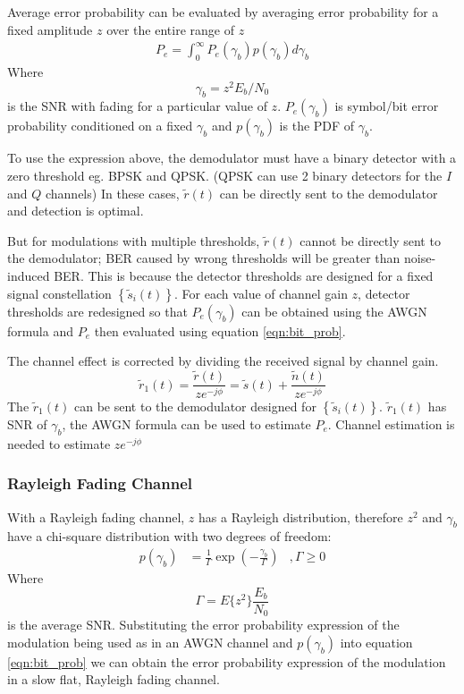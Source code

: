 Average error probability can be evaluated by averaging error probability for a fixed amplitude $z$ over the entire range of $z$
\begin{align}
P_e = \int_0^\infty P_e(\gamma_b)p(\gamma_b)d\gamma_b
\label{eqn:bit_prob}
\end{align}
Where
$$\gamma_b = z^2E_b/N_0$$
is the \gls{SNR} with fading for a particular value of $z$. $P_e(\gamma_b)$ is symbol/bit error probability conditioned on a fixed $\gamma_b$ and $p(\gamma_b)$ is the \gls{PDF} of $\gamma_b$.

To use the expression above, the demodulator must have a binary detector with a zero threshold eg. B\gls{PSK} and Q\gls{PSK}. (Q\gls{PSK} can use 2 binary detectors for the $I$ and $Q$ channels) In these cases, $\tilde{r}(t)$ can be directly sent to the demodulator and detection is optimal.

But for modulations with multiple thresholds, $\tilde{r}(t)$ cannot be directly sent to the demodulator; \gls{BER} caused by wrong thresholds will be greater than noise-induced \gls{BER}. This is because the detector thresholds are designed for a fixed signal constellation $\left\{\tilde{s}_i(t)\right\}$. For each value of channel gain $z$, detector thresholds are redesigned so that $P_e(\gamma_b)$ can be obtained using the \gls{AWGN} formula and $P_e$ then evaluated using equation \ref{eqn:bit_prob}.

The channel effect is corrected by dividing the received signal by channel gain.
$$\tilde{r}_1(t) = \frac{\tilde{r}(t)}{ze^{-j\phi}} = \tilde{s}(t) + \frac{\tilde{n}(t)}{ze^{-j\phi}}$$
The $\tilde{r}_1(t)$ can be sent to the demodulator designed for $\left\{\tilde{s}_i(t)\right\}$. $\tilde{r}_1(t)$ has \gls{SNR} of $\gamma_b$, the \gls{AWGN} formula can be used to estimate $P_e$. Channel estimation is needed to estimate $ze^{-j\phi}$

\subsubsection{Rayleigh Fading Channel}
With a Rayleigh fading channel, $z$ has a Rayleigh distribution, therefore $z^2$ and $\gamma_b$ have a chi-square distribution with two degrees of freedom:
\begin{align}
p(\gamma_b) &= \frac{1}{\Gamma}\exp \left( -\frac{\gamma_b}{\Gamma}\right) &, \Gamma \geq 0
\label{eqn:ray_pdf}
\end{align}
Where
$$\Gamma = E\{z^2\}\frac{E_b}{N_0}$$
is the average \gls{SNR}.
Substituting the error probability expression of the modulation being used as in an \gls{AWGN} channel and $p(\gamma_b)$ into equation \ref{eqn:bit_prob} we can obtain the error probability expression of the modulation in a slow flat, Rayleigh fading channel.

